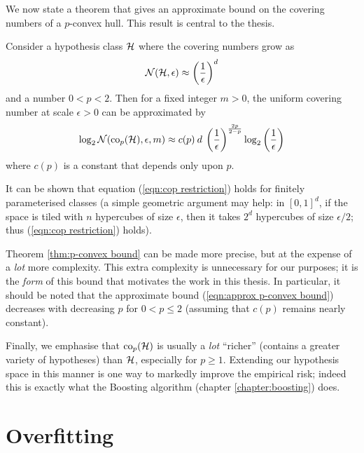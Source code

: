 We now state a theorem that gives an approximate bound on the covering
numbers of a $p$-convex hull.  This result is central to the thesis.

\begin{theorem}
\label{thm:p-convex bound}
Consider a hypothesis class $\mathcal{H}$ where the covering numbers grow as
%
\begin{equation}
\mathcal{N}({\mathcal{H}}, {\epsilon}) \approx \left( \frac{1}{\epsilon} \right) ^d
\label{eqn:cop restriction}
\end{equation}
%
and a number $0 < p < 2$.  Then for a fixed integer $m>0$, the
uniform covering number at scale $\epsilon > 0$ can be approximated by
%
\begin{equation}
\label{eqn:approx p-convex bound}
\log_2 \mathcal{N}({\mathrm{co}_p(\mathcal{H})}, {\epsilon}, {m}) \approx c(p) \: d \: \left(\frac{1}
{\epsilon}\right)^{\frac{2p}{2-p}} \log_2 \left(\frac{1}{\epsilon}\right)
\end{equation}
%
where $c(p)$ is a constant that depends only upon $p$.
\end{theorem}

It can be shown that equation (\ref{eqn:cop restriction}) holds for
finitely parameterised classes (a simple geometric argument may help:
in $[0,1]^d$, if the space is tiled with $n$ hypercubes of size
$\epsilon$, then it takes $2^d$ hypercubes of size $\epsilon/2$; thus
(\ref{eqn:cop restriction}) holds).
 
Theorem \ref{thm:p-convex bound} can be made more precise, but at
the expense of a \emph{lot} more complexity.  This extra complexity is
unnecessary for our purposes; it is the \emph{form} of this bound that
motivates the work in this thesis. In particular, it should be noted
that the approximate bound (\ref{eqn:approx p-convex bound}) decreases
with decreasing $p$ for $0 < p \leq 2$ (assuming that $c(p)$ remains
nearly constant).

Finally, we emphasise that $\mathrm{co}_{p}(\mathcal{H})$ is usually a \emph{lot}
``richer'' (contains a greater variety of hypotheses) than $\mathcal{H}$,
especially for $p \geq 1$.  Extending our hypothesis space in this
manner is one way to markedly improve the empirical risk; indeed this
is exactly what the Boosting algorithm (chapter
\ref{chapter:boosting}) does.


\section{Overfitting}
\label{sec:overfitting}

